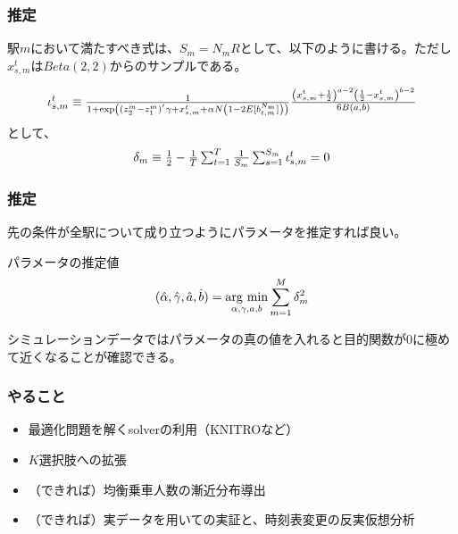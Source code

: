 \documentclass[dvipdfmx, 12pt]{beamer}
\begin{document}
\begin{frame}\frametitle{推定}
	駅$m$において満たすべき式は、$S_m = N_m R$として、以下のように書ける。ただし$x_{s, m}^t$は$Beta(2,2)$からのサンプルである。
	
	\begin{align*}
	\scalebox{1}{$
	\iota_{s, m}^t \equiv \frac{1}{1 + \exp\left( (z_2^m - z_1^m)^{'}\gamma + x_{s,m}^t + \alpha N \left(1 - 2E[b_{t,m}^{N_m}]\right) \right)} \frac{\left(x_{s,m}^t + \frac{1}{2}\right)^{a - 2} \left(\frac{1}{2} - x_{s,m}^t \right)^{b-2}}{6B(a, b)} $}
	\end{align*}
	として、
	\begin{align*}
	\scalebox{1}{$
	\delta_m \equiv \frac{1}{2} - \frac{1}{T}\sum_{t = 1}^T \frac{1}{S_m}\sum_{s = 1}^{S_m} \iota_{s, m}^t = 0 $}
	\end{align*}
\end{frame}

\begin{frame}\frametitle{推定}
	先の条件が全駅について成り立つようにパラメータを推定すれば良い。
	
	\begin{itembox}[l]{パラメータの推定値}
	\begin{align*}
		(\hat{\alpha}, \hat{\gamma}, \hat{a}, \hat{b}) = \mathop{\rm arg~min}\limits_{\alpha, \gamma, a, b} \sum_{m = 1}^M \delta_m^2
	\end{align*}
	\end{itembox}
	
	シミュレーションデータではパラメータの真の値を入れると目的関数が0に極めて近くなることが確認できる。
\end{frame}

\begin{frame}\frametitle{やること}
	\begin{itemize}
		\item 最適化問題を解くsolverの利用（KNITROなど）
		\item $K$選択肢への拡張
		\item （できれば）均衡乗車人数の漸近分布導出
		\item （できれば）実データを用いての実証と、時刻表変更の反実仮想分析
	\end{itemize}
\end{frame}
\end{document}
